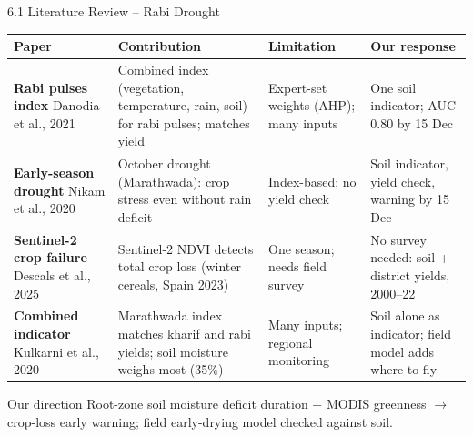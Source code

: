 \documentclass[aspectratio=169,10pt]{beamer}
\begin{document}
\begin{frame}{6.1 Literature Review -- Rabi Drought}
\footnotesize
\renewcommand{\arraystretch}{1.12}
\begin{tabularx}{\textwidth}{|>{\raggedright\arraybackslash}p{3.3cm}|Y|Y|Y|}
\hline
\textbf{Paper} & \textbf{Contribution} & \textbf{Limitation} & \textbf{Our response} \\ \hline
\textbf{Rabi pulses index} \newline Danodia et al., 2021 & Combined index (vegetation, temperature, rain, soil) for rabi pulses; matches yield & Expert-set weights (AHP); many inputs & One soil indicator; AUC 0.80 by 15 Dec \\ \hline
\textbf{Early-season drought} \newline Nikam et al., 2020 & October drought (Marathwada): crop stress even without rain deficit & Index-based; no yield check & Soil indicator, yield check, warning by 15 Dec \\ \hline
\textbf{Sentinel-2 crop failure} \newline Descals et al., 2025 & Sentinel-2 NDVI detects total crop loss (winter cereals, Spain 2023) & One season; needs field survey & No survey needed: soil + district yields, 2000--22 \\ \hline
\textbf{Combined indicator} \newline Kulkarni et al., 2020 & Marathwada index matches kharif and rabi yields; soil moisture weighs most (35\%) & Many inputs; regional monitoring & Soil alone as indicator; field model adds where to fly \\ \hline
\end{tabularx}
\begin{card}{Our direction}
\footnotesize Root-zone soil moisture deficit duration + MODIS greenness $\rightarrow$ crop-loss early warning; field early-drying model checked against soil.
\end{card}
\end{frame}
\end{document}
